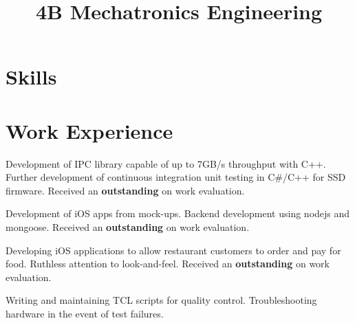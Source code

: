 \documentclass[11pt,a4paper]{moderncv}
\title{4B Mechatronics Engineering}               %
\begin{document}
\maketitle

\vspace{-13mm}

\section{Skills}


\section{Work Experience}
{Development of IPC library capable of up to 7GB/s throughput with C++.
    \newline{}Further development of continuous integration unit testing in C\#/C++ for SSD firmware.
\newline{}Received an \textbf{outstanding} on work evaluation.}

{Development of iOS apps from mock-ups.
    \newline{}Backend development using nodejs and mongoose.
\newline{}Received an \textbf{outstanding} on work evaluation.}

{Developing iOS applications to allow restaurant customers to order and pay for food.
\newline{} Ruthless attention to look-and-feel.
\newline{}Received an \textbf{outstanding} on work evaluation.}

{Writing and maintaining TCL scripts for quality control.
    \newline{}Troubleshooting hardware in the event of test failures.}
\end{document}
